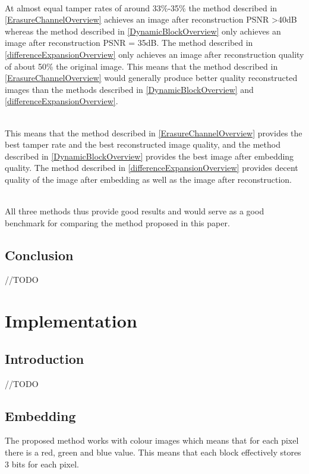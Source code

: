 \documentclass[12pt]{article}
\begin{document}
\hspace{0pt} \\
At almost equal tamper rates of around 33\%-35\% the method described in \ref{ErasureChannelOverview} achieves an image after reconstruction PSNR \textgreater 40dB whereas the method described in \ref{DynamicBlockOverview} only achieves an image after reconstruction PSNR = 35dB.
The method described in \ref{differenceExpansionOverview} only achieves an image after reconstruction quality of about 50\% the original image.
This means that the method described in \ref{ErasureChannelOverview} would generally produce better quality reconstructed images than the methods described in \ref{DynamicBlockOverview} and \ref{differenceExpansionOverview}.

\hspace{0pt} \\
This means that the method described in \ref{ErasureChannelOverview} provides the best tamper rate and the best reconstructed image quality, and the method described in \ref{DynamicBlockOverview} provides the best image after embedding quality.
The method described in \ref{differenceExpansionOverview} provides decent quality of the image after embedding as well as the image after reconstruction.

\hspace{0pt} \\
All three methods thus provide good results and would serve as a good benchmark for comparing the method proposed in this paper.

\subsection{Conclusion}
//TODO 

\section{Implementation}
\label{Implementation}
\subsection{Introduction}
//TODO

\subsection{Embedding}
\label{embedding}

The proposed method works with colour images which means that for each pixel there is a red, green and blue value. This means that each block effectively stores 3 bits for each pixel.
\end{document}
